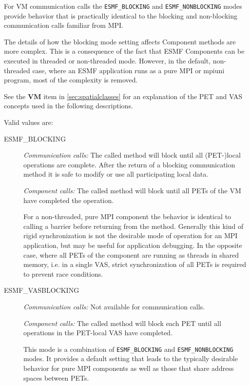 For VM communication calls the {\tt ESMF\_BLOCKING} and {\tt ESMF\_NONBLOCKING}
modes provide behavior that is practically identical to the blocking and
non-blocking communication calls familiar from MPI.

The details of how the blocking mode setting affects Component methods are
more complex. This is a consequence of the fact that ESMF Components can be
executed in threaded or non-threaded mode. However, in the default,
non-threaded case, where an ESMF application runs as a pure MPI or mpiuni
program, most of the complexity is removed.

See the {\bf VM} item in \ref{sec:spatialclasses} for an
explanation of the PET and VAS concepts used in the following
descriptions.
         
Valid values are:
\begin{description}

\item [ESMF\_BLOCKING]
         {\em Communication calls:} The called method will block until all
         (PET-)local operations are complete. After the return of a blocking
         communication method it is safe to modify or use all participating
         local data.
         
         {\em Component calls:} The called method will block until all PETs of
         the VM have completed the operation.
         
         For a non-threaded, pure MPI
         component the behavior is identical to calling a barrier before 
         returning from the method. Generally this kind of rigid 
         synchronization is not the desirable mode of operation for an MPI
         application, but may be useful for application debugging.
         In the opposite case, where all PETs of the component are running as
         threads in shared memory, i.e. in a single VAS, strict synchronization
         of all PETs is required to prevent race conditions.

\item [ESMF\_VASBLOCKING]
         {\em Communication calls:} Not available for communication calls.
         
         {\em Component calls:} The called method will block each PET until
         all operations in the PET-local VAS have completed. 
         
         This mode is a combination of {\tt ESMF\_BLOCKING} and
         {\tt ESMF\_NONBLOCKING} modes. It provides a default setting 
         that leads to the typically desirable behavior for pure MPI 
         components as well as those that share address spaces between PETs.
         

\end{description}
